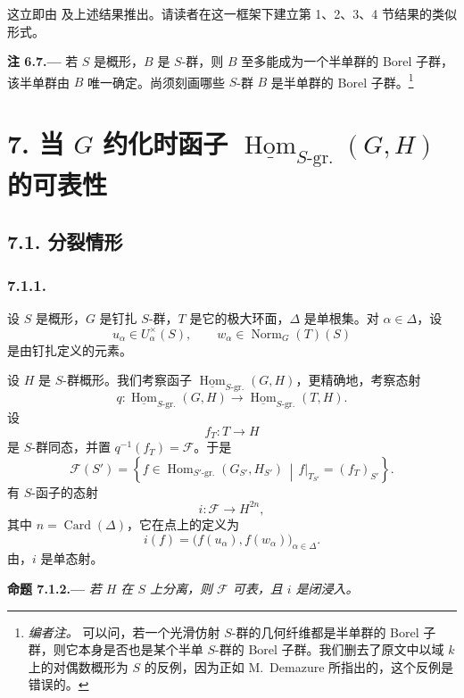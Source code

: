 这立即由  及上述结果推出。请读者在这一框架下建立第 1、2、3、4 节结果的类似形式。

\par\medskip\noindent{}\textbf{注 6.7.---}\enspace
若 \(S\) 是概形，\(B\) 是 \(S\)-群，则 \(B\) 至多能成为一个半单群的 Borel 子群，该半单群由 \(B\) 唯一确定。尚须刻画哪些 \(S\)-群 \(B\) 是半单群的 Borel 子群。\footnote{\textit{编者注。} 可以问，若一个光滑仿射 \(S\)-群的几何纤维都是半单群的 Borel 子群，则它本身是否也是某个半单 \(S\)-群的 Borel 子群。我们删去了原文中以域 \(k\) 上的对偶数概形为 \(S\) 的反例，因为正如 M.~Demazure 所指出的，这个反例是错误的。}

\section*{7. 当 \(G\) 约化时函子 \(\underline{\operatorname{Hom}}_{S\text{-}\mathrm{gr.}}(G,H)\) 的可表性}
\subsection*{7.1. 分裂情形}
\subsubsection*{7.1.1.}
设 \(S\) 是概形，\(G\) 是钉扎 \(S\)-群，\(T\) 是它的极大环面，\(\Delta\) 是单根集。对 \(\alpha\in\Delta\)，设
\[
  u_\alpha\in U_\alpha^\times(S),
  \qquad
  w_\alpha\in\operatorname{Norm}_G(T)(S)
\]
是由钉扎定义的元素。

设 \(H\) 是 \(S\)-群概形。我们考察函子 \(\underline{\operatorname{Hom}}_{S\text{-}\mathrm{gr.}}(G,H)\)，更精确地，考察态射
\[
  q:\underline{\operatorname{Hom}}_{S\text{-}\mathrm{gr.}}(G,H)
  \longrightarrow
  \underline{\operatorname{Hom}}_{S\text{-}\mathrm{gr.}}(T,H).
\]
设
\[
  f_T:T\longrightarrow H
\]
是 \(S\)-群同态，并置 \(q^{-1}(f_T)=\mathscr F\)。于是
\[
  \mathscr F(S')
  =
  \left\{
    f\in\operatorname{Hom}_{S'\text{-}\mathrm{gr.}}
      (G_{S'},H_{S'})
    \,\middle|\,
    f|_{T_{S'}}=(f_T)_{S'}
  \right\}.
\]
有 \(S\)-函子的态射
\[
  i:\mathscr F\longrightarrow H^{2n},
\]
其中 \(n=\operatorname{Card}(\Delta)\)，它在点上的定义为
\[
  i(f)=\bigl(f(u_\alpha),f(w_\alpha)\bigr)_{\alpha\in\Delta}.
\]
由，\(i\) 是单态射。

\par\medskip\noindent{}\textbf{命题 7.1.2.---}\enspace
\emph{若 \(H\) 在 \(S\) 上分离，则 \(\mathscr F\) 可表，且 \(i\) 是闭浸入。}


